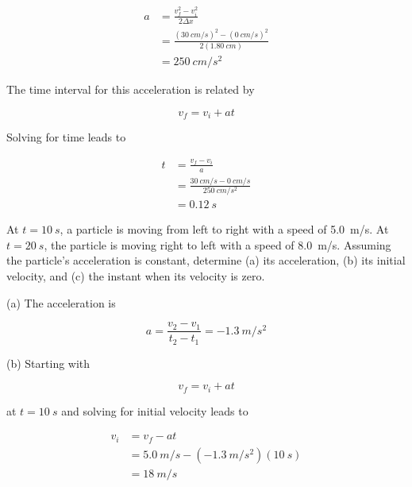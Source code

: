 \documentclass[../main-physics-problems.tex]{subfiles}
\begin{document}
\begin{questions}
\begin{solution}
\begin{align*}
    a &= \frac{v_f^2 - v_i^2}{2 \Delta x} \\[1ex]
    &= \frac{(\SI{30}{cm/s})^2 - (\SI{0}{cm/s})^2}{2(\SI{1.80}{cm})} \\[1ex]
    &= \SI{250}{cm/s^2}
\end{align*}

The time interval for this acceleration is related by

\begin{equation*}
    v_f = v_i + at
\end{equation*}

Solving for time leads to

\begin{align*}
    t &= \frac{v_f - v_i}{a} \\[1ex]
    &= \frac{\SI{30}{cm/s} - \SI{0}{cm/s}}{\SI{250}{cm/s^2}} \\[1ex]
    &= \boxed{\SI{0.12}{s}}
\end{align*}
\end{solution}

\question \label{kinematic-particle} %
At $t = \SI{10}{s}$, a particle is moving from left to right with a speed of \SI{5.0}{m/s}. At $t = \SI{20}{s}$, the particle is moving right to left with a speed of \SI{8.0}{m/s}. Assuming the particle's acceleration is constant, determine (a) its acceleration, (b) its initial velocity, and (c) the instant when its velocity is zero.

\begin{solution}
(a) The acceleration is

    \begin{equation*}
        a = \frac{v_2 - v_1}{t_2 - t_1} = \SI{-1.3}{m/s^2}
    \end{equation*}

(b) Starting with

    \begin{equation*}
        v_f = v_i + at
    \end{equation*}

    at $t = \SI{10}{s}$ and solving for initial velocity leads to

    \begin{align*}
        v_i &= v_f - at \\[1ex]
        &= \SI{5.0}{m/s} - (-\SI{1.3}{m/s^2}) (\SI{10}{s}) \\[1ex]
        &= \boxed{\SI{18}{m/s}}
    \end{align*}


\end{solution}
\end{questions}
\end{document}
